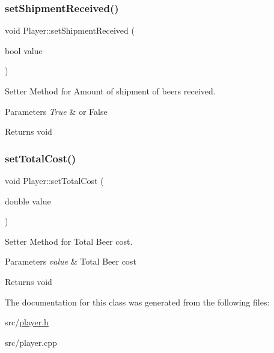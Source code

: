 \subsubsection{\texorpdfstring{set\+Shipment\+Received()}{setShipmentReceived()}}
{\footnotesize\ttfamily void Player\+::set\+Shipment\+Received (\begin{DoxyParamCaption}\item[{bool}]{value }\end{DoxyParamCaption})}



Setter Method for Amount of shipment of beers received. 


\begin{DoxyParams}{Parameters}
{\em True} & or False \\
\hline
\end{DoxyParams}
\begin{DoxyReturn}{Returns}
void 
\end{DoxyReturn}
\mbox{\label{classPlayer_ab79475527bb480b01d004106580158b5}} 
\subsubsection{\texorpdfstring{set\+Total\+Cost()}{setTotalCost()}}
{\footnotesize\ttfamily void Player\+::set\+Total\+Cost (\begin{DoxyParamCaption}\item[{double}]{value }\end{DoxyParamCaption})}



Setter Method for Total Beer cost. 


\begin{DoxyParams}{Parameters}
{\em value} & Total Beer cost \\
\hline
\end{DoxyParams}
\begin{DoxyReturn}{Returns}
void 
\end{DoxyReturn}


The documentation for this class was generated from the following files\+:\begin{DoxyCompactItemize}
\item 
src/\hyperlink{player_8h}{player.\+h}\item 
src/player.\+cpp\end{DoxyCompactItemize}
